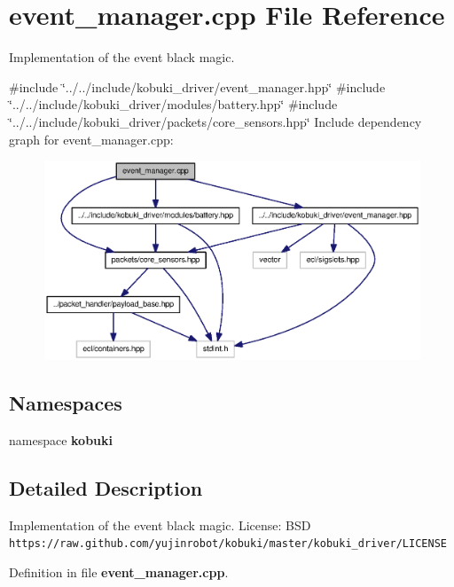 \section{event\-\_\-manager.\-cpp \-File \-Reference}
\label{event__manager_8cpp}


\-Implementation of the event black magic.  


{\ttfamily \#include \char`\"{}../../include/kobuki\-\_\-driver/event\-\_\-manager.\-hpp\char`\"{}}\*
{\ttfamily \#include \char`\"{}../../include/kobuki\-\_\-driver/modules/battery.\-hpp\char`\"{}}\*
{\ttfamily \#include \char`\"{}../../include/kobuki\-\_\-driver/packets/core\-\_\-sensors.\-hpp\char`\"{}}\*
\-Include dependency graph for event\-\_\-manager.\-cpp\-:
\nopagebreak
\begin{figure}[H]
\begin{center}
\leavevmode
\includegraphics[width=350pt]{event__manager_8cpp__incl}
\end{center}
\end{figure}
\subsection*{\-Namespaces}
\begin{DoxyCompactItemize}
\item 
namespace {\bf kobuki}
\end{DoxyCompactItemize}


\subsection{\-Detailed \-Description}
\-Implementation of the event black magic. \-License\-: \-B\-S\-D {\tt https\-://raw.\-github.\-com/yujinrobot/kobuki/master/kobuki\-\_\-driver/\-L\-I\-C\-E\-N\-S\-E} 

\-Definition in file {\bf event\-\_\-manager.\-cpp}.

